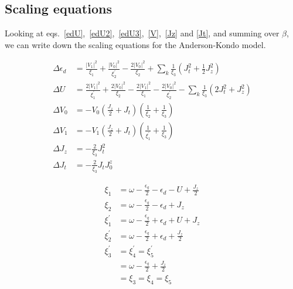 \documentclass[12pt,twoside]{article}
\numberwithin{equation}{section}
\begin{document}
\subsection{Scaling equations}
Looking at eqs.~\ref{edU},~\ref{edU2},~\ref{edU3},~\ref{V},~\ref{Jz} and \ref{Jt}, and summing over \(\beta\), we can write down the scaling equations for the Anderson-Kondo model.
\pb \begin{minipage}{320pt}
\begin{equation}\begin{aligned}
	\Delta \epsilon_d &= \frac{|V_1|^2}{\xi_1} + \frac{|V_0|^2}{\xi_2^\prime} - \frac{2|V_0|^2}{\xi_2} + \sum_k \frac{1}{\xi_3}\left(J_t^2  + \frac{1}{2}J_z^2\right)\\
	\Delta U &= \frac{2|V_1|^2}{\xi_1^\prime} + \frac{2|V_0|^2}{\xi_2} - \frac{2|V_1|^2}{\xi_1} - \frac{2|V_0|^2}{\xi_2^\prime} - \sum_k \frac{1}{\xi_3}\left(2J_t^2 + J_z^2\right)\\
	\Delta V_0 &= -V_0\left(\frac{J_z}{2} + J_t \right) \left(\frac{1}{\xi_2} + \frac{1}{\xi_3}\right)\\
	\Delta V_1 &= -V_1\left(\frac{J_z}{2} + J_t \right) \left(\frac{1}{\xi^\prime_1} + \frac{1}{\xi_3}\right)\\
	\Delta J_z &= -\frac{2}{\xi_3}J_t^2\\
	\Delta J_t &= -\frac{2}{\xi_3}J_t J^z_0
\end{aligned}\end{equation}
\end{minipage}
\vline
\begin{minipage}{150pt}
\begin{equation*}\begin{aligned}
	\xi_1 &= \omega - \frac{\epsilon_q}{2} - \epsilon_d - U + \frac{J_z}{2}\\
	\xi_2 &= \omega - \frac{\epsilon_q}{2} - \epsilon_d + J_z\\
	\xi_1^\prime &= \omega - \frac{\epsilon_q}{2} + \epsilon_d + U + J_z\\
	\xi_2^\prime &= \omega - \frac{\epsilon_q}{2} + \epsilon_d + \frac{J_z}{2}\\
	\xi_3^\prime &= \xi_4^\prime = \xi_5^\prime \\
		     &= \omega - \frac{\epsilon_q}{2} + \frac{J_z}{2}\\
		     &= \xi_3 = \xi_4 = \xi_5\\
\end{aligned}\end{equation*}
\end{minipage}
\end{document}
